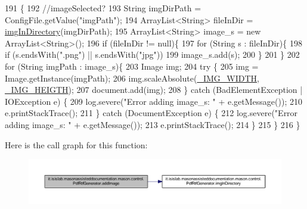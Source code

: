 \begin{DoxyCode}
191                                              \{
192         \textcolor{comment}{//imageSelected?}
193         String imgDirPath = ConfigFile.getValue(\textcolor{stringliteral}{"imgPath"});
194         ArrayList<String> fileInDir = \hyperlink{classit_1_1isislab_1_1masonassisteddocumentation_1_1mason_1_1control_1_1_pdf_rtf_generator_ac64a0fecc25dd00c58f569e111c06fe6}{imgInDirectory}(imgDirPath);
195         ArrayList<String> image\_s = \textcolor{keyword}{new} ArrayList<String>();
196         \textcolor{keywordflow}{if} (fileInDir != null)\{
197             \textcolor{keywordflow}{for} (String s : fileInDir)\{
198                 \textcolor{keywordflow}{if} (s.endsWith(\textcolor{stringliteral}{".png"}) || s.endsWith(\textcolor{stringliteral}{"jpg"}))
199                     image\_s.add(s);
200             \}
201         \}
202         \textcolor{keywordflow}{for} (String imgPath : image\_s)\{
203             Image img;
204             \textcolor{keywordflow}{try} \{
205                 img = Image.getInstance(imgPath);
206                 img.scaleAbsolute(\hyperlink{classit_1_1isislab_1_1masonassisteddocumentation_1_1mason_1_1control_1_1_pdf_rtf_generator_a6b1361e9b6de024b9aef76564ab8a6b1}{\_IMG\_WIDTH}, \hyperlink{classit_1_1isislab_1_1masonassisteddocumentation_1_1mason_1_1control_1_1_pdf_rtf_generator_a10a4f82a6bf2ff579193de7a28c84ac6}{\_IMG\_HEIGTH});
207                 document.add(img);
208             \} \textcolor{keywordflow}{catch} (BadElementException | IOException e) \{
209                 log.severe(\textcolor{stringliteral}{"Error adding image\_s: "} + e.getMessage());
210                 e.printStackTrace();
211             \} \textcolor{keywordflow}{catch} (DocumentException e) \{
212                 log.severe(\textcolor{stringliteral}{"Error adding image\_s: "} + e.getMessage());
213                 e.printStackTrace();
214             \}
215         \}
216     \}
\end{DoxyCode}


Here is the call graph for this function\-:\nopagebreak
\begin{figure}[H]
\begin{center}
\leavevmode
\includegraphics[width=350pt]{classit_1_1isislab_1_1masonassisteddocumentation_1_1mason_1_1control_1_1_pdf_rtf_generator_a256d403130ef860861402da49b373042_cgraph}
\end{center}
\end{figure}





